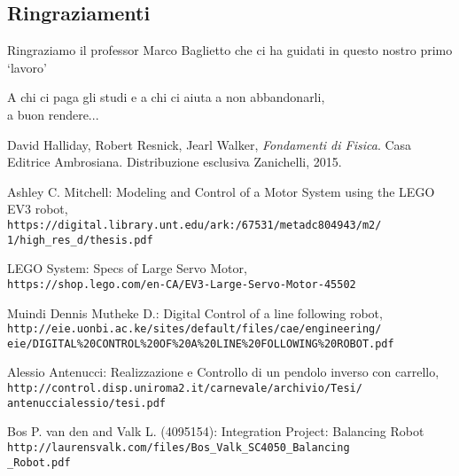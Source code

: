 \documentclass[a4paper,11pt,twoside]{book}
\makeatletter
\renewcommand{\frontmatter}{%
	\cleardoublepage\@mainmatterfalse 
	\pagenumbering{smallRoman}}
\makeatother
\begin{document}


\vfill


\newpage\null\thispagestyle{empty}\newpage

\frontmatter
\thispagestyle{empty}
\null{}
\begin{center}
	\section*{Ringraziamenti}
		Ringraziamo il professor Marco Baglietto che ci ha guidati in questo nostro primo `lavoro'
\end{center}
\null
\newpage
\begin{flushright}
	\null{}
	A chi ci paga gli studi e a chi ci aiuta a non abbandonarli,\\ a buon rendere...
	\null
\end{flushright}

\tableofcontents
\listoffigures
\listoftables
\mainmatter






\begin{thebibliography}{9}

	
	David Halliday, Robert Resnick, Jearl Walker, 
	\textit{Fondamenti di Fisica}. 
	Casa Editrice Ambrosiana. Distribuzione esclusiva Zanichelli, 2015.
	
	Ashley C. Mitchell: Modeling and Control of a Motor System using the LEGO EV3 robot,
	\\\texttt{https://digital.library.unt.edu/ark:/67531/metadc804943/m2/\\1/high\_res\_d/thesis.pdf}
	
	LEGO System: Specs of Large Servo Motor,
	\\\texttt{https://shop.lego.com/en-CA/EV3-Large-Servo-Motor-45502}
	
	Muindi Dennis Mutheke D.: Digital Control of a line following robot,
	\\\texttt{http://eie.uonbi.ac.ke/sites/default/files/cae/engineering/
		\\eie/DIGITAL\%20CONTROL\%20OF\%20A\%20LINE\%20FOLLOWING\%20ROBOT.pdf}
	
	Alessio Antenucci: Realizzazione e Controllo di un pendolo inverso con carrello,
	\\\texttt{http://control.disp.uniroma2.it/carnevale/archivio/Tesi/\\antenuccialessio/tesi.pdf}
	
	Bos P. van den and Valk L. (4095154): Integration Project: Balancing Robot
	\\\texttt{http://laurensvalk.com/files/Bos\_Valk\_SC4050\_Balancing\\\_Robot.pdf}
	
	
	
\end{thebibliography}
\end{document}
